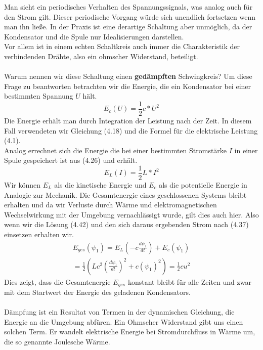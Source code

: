 \documentclass[11pt,a4paper,leqno]{report}
\numberwithin{equation}{chapter}
\begin{document}
\noindent
Man sieht ein periodisches Verhalten des Spannungssignals, was analog auch f\"ur den Strom gilt. Dieser periodische Vorgang w\"urde sich unendlich fortsetzen wenn man ihn lie\ss{}e. In der Praxis ist eine derartige Schaltung aber unm\"oglich, da der Kondensator und die Spule nur Idealisierungen darstellen.\\
Vor allem ist in einem echten Schaltkreis auch immer die Charakteristik der verbindenden Dr\"ahte, also ein ohmscher Widerstand, beteiligt.\\
\\
Warum nennen wir diese Schaltung einen \textbf{ged\"ampften} Schwingkreis? Um diese Frage zu beantworten betrachten wir die Energie, die ein Kondensator bei einer bestimmten Spannung $U$ h\"alt. 
\begin{equation}
	E_c(U) = \frac{1}{2}c * U^2
\end{equation}
Die Energie erh\"alt man durch Integration der Leistung nach der Zeit. In diesem Fall verwendeten wir Gleichung (4.18) und die Formel f\"ur die elektrische Leistung (4.1).\\
Analog errechnet sich die Energie die bei einer bestimmten Stromst\"arke $I$ in einer Spule gespeichert ist aus (4.26) und erh\"alt.
\begin{equation}
	E_L(I) = \frac{1}{2}L * I^2
\end{equation}
Wir k\"onnen $E_L$ als die kinetische Energie und $E_c$ als die potentielle Energie in Analogie zur Mechanik. Die Gesamtenergie eines geschlossenen Systems bleibt erhalten und da wir Verluste durch W\"arme und elektromagnetischen Wechselwirkung mit der Umgebung vernachl\"assigt wurde, gilt dies auch hier. Also wenn wir die L\"osung (4.42) und den sich daraus ergebenden Strom nach (4.37) einsetzen erhalten wir.
\begin{align*}
E_{ges}(\psi_1) = E_L(-c\frac{d\psi_1}{dt}) + E_c(\psi_1)\\
= \frac{1}{2}(Lc^2(\frac{d\psi_1}{dt})^2  + c(\psi_1)^2) = \frac{1}{2}cu^2
\end{align*}
Dies zeigt, dass die Gesamtenergie $E_{ges}$ konstant bleibt f\"ur alle Zeiten und zwar mit dem Startwert der Energie des geladenen Kondensators.\\
\\
D\"ampfung ist ein Resultat von Termen in der dynamischen Gleichung, die Energie an die Umgebung abf\"uren. Ein Ohmscher Widerstand gibt uns einen solchen Term. Er wandelt elektrische Energie bei Stromdurchfluss in W\"arme um, die so genannte Joulesche W\"arme.\\
\end{document}
